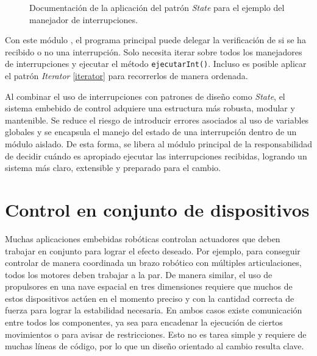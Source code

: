 \begin{figure}[H]
\caption{Documentación de la aplicación del patrón \textit{State} para el ejemplo del manejador de interrupciones.}
\label{docStateInt}
\end{figure}


Con este módulo \Manejador, el programa principal puede delegar la verificación de si se ha recibido o no una interrupción. Solo necesita iterar sobre todos los manejadores de interrupciones y ejecutar el método \verb|ejecutarInt()|. Incluso es posible aplicar el patrón \textit{Iterator} \ref{iterator} para recorrerlos de manera ordenada.

Al combinar el uso de interrupciones con patrones de diseño como \textit{State}, el sistema embebido de control adquiere una estructura más robusta, modular y mantenible. Se reduce el riesgo de introducir errores asociados al uso de variables globales y se encapsula el manejo del estado de una interrupción dentro de un módulo aislado. De esta forma, se libera al módulo principal de la responsabilidad de decidir cuándo es apropiado ejecutar las interrupciones recibidas, logrando un sistema más claro, extensible y preparado para el cambio.



\section{Control en conjunto de dispositivos}
Muchas aplicaciones embebidas robóticas controlan \gls{actuadores} que deben trabajar en conjunto para lograr el efecto deseado. Por ejemplo, para conseguir controlar de manera coordinada un brazo robótico con múltiples articulaciones, todos los motores deben trabajar a la par. De manera similar, el uso de propulsores en una nave espacial en tres dimensiones requiere que muchos de estos dispositivos actúen en el momento preciso y con la cantidad correcta de fuerza para lograr la estabilidad necesaria. En ambos casos existe comunicación entre todos los componentes, ya sea para encadenar la ejecución de ciertos movimientos o para avisar de restricciones. Esto no es tarea simple y requiere de muchas líneas de código, por lo que un diseño orientado al cambio resulta clave.

